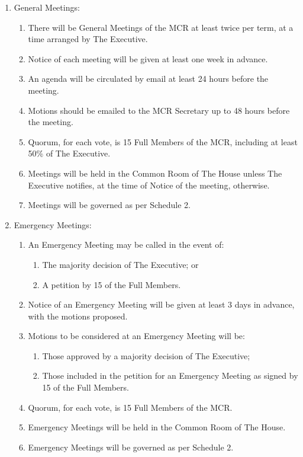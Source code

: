 \documentclass[11pt, a4paper]{article}
\begin{document}
\begin{enumerate}
	\item General Meetings:
        \begin{enumerate}
      		\item There will be General Meetings of the MCR at least twice per term, at a time arranged by The Executive.
      		\item Notice of each meeting will be given at least one week in advance.
            \item An agenda will be circulated by email at least 24 hours before the meeting.
            \item Motions should be emailed to the MCR Secretary up to 48 hours before the meeting.
            \item Quorum, for each vote, is 15 Full Members of the MCR, including at least 50\% of The Executive.
            \item Meetings will be held in the Common Room of The House unless The Executive notifies, at the time of Notice of the meeting, otherwise.
            \item Meetings will be governed as per Schedule 2.
		\end{enumerate}
    \item Emergency Meetings:
    	\begin{enumerate}
      		\item An Emergency Meeting may be called in the event of:
            	\begin{enumerate}
                	\item The majority decision of The Executive; or
                    \item A petition by 15 of the Full Members.
                \end{enumerate}
      		\item Notice of an Emergency Meeting will be given at least 3 days in advance, with the motions proposed.
            \item Motions to be considered at an Emergency Meeting will be:
            	\begin{enumerate}
                	\item Those approved by a majority decision of The Executive;
                    \item Those included in the petition for an Emergency Meeting as signed by 15 of the Full Members.
                \end{enumerate}
            \item Quorum, for each vote, is 15 Full Members of the MCR.
            \item Emergency Meetings will be held in the Common Room of The House.
            \item Emergency Meetings will be governed as per Schedule 2.
		\end{enumerate}
\end{enumerate}
\end{document}
